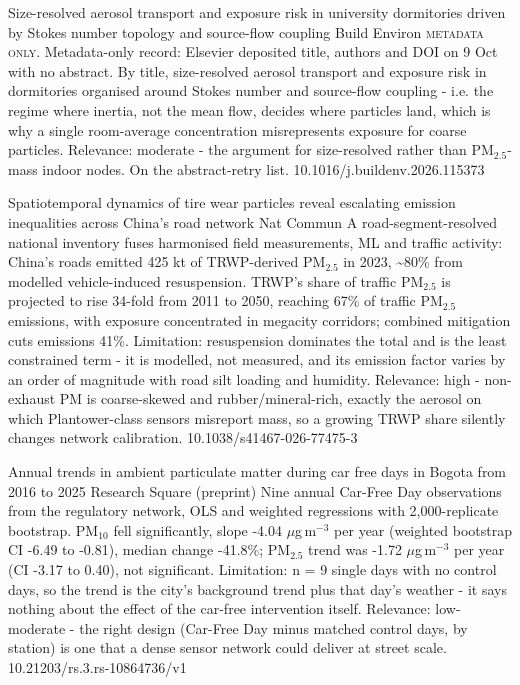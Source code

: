 \documentclass[10pt]{article}
\begin{document}
{Size-resolved aerosol transport and exposure risk in university dormitories driven by Stokes number topology and source-flow coupling}
{Build Environ}
{\textsc{metadata only.} Metadata-only record: Elsevier deposited title, authors and DOI on 9 Oct with no abstract. By title, size-resolved aerosol transport and exposure risk in dormitories organised around Stokes number and source-flow coupling - i.e. the regime where inertia, not the mean flow, decides where particles land, which is why a single room-average concentration misrepresents exposure for coarse particles. Relevance: moderate - the argument for size-resolved rather than PM$_{2.5}$-mass indoor nodes. On the abstract-retry list.}
{10.1016/j.buildenv.2026.115373}

\par{}\baselineskip{}\baselineskip
{}

{Spatiotemporal dynamics of tire wear particles reveal escalating emission inequalities across China's road network}
{Nat Commun}
{A road-segment-resolved national inventory fuses harmonised field measurements, ML and traffic activity: China's roads emitted 425 kt of TRWP-derived PM$_{2.5}$ in 2023, \textasciitilde{}80\% from modelled vehicle-induced resuspension. TRWP's share of traffic PM$_{2.5}$ is projected to rise 34-fold from 2011 to 2050, reaching 67\% of traffic PM$_{2.5}$ emissions, with exposure concentrated in megacity corridors; combined mitigation cuts emissions 41\%. Limitation: resuspension dominates the total and is the least constrained term - it is modelled, not measured, and its emission factor varies by an order of magnitude with road silt loading and humidity. Relevance: high - non-exhaust PM is coarse-skewed and rubber/mineral-rich, exactly the aerosol on which Plantower-class sensors misreport mass, so a growing TRWP share silently changes network calibration.}
{10.1038/s41467-026-77475-3}

{Annual trends in ambient particulate matter during car free days in Bogota from 2016 to 2025}
{Research Square (preprint)}
{Nine annual Car-Free Day observations from the regulatory network, OLS and weighted regressions with 2,000-replicate bootstrap. PM$_{10}$ fell significantly, slope -4.04 $\mu$g\,m$^{-3}$ per year (weighted bootstrap CI -6.49 to -0.81), median change -41.8\%; PM$_{2.5}$ trend was -1.72 $\mu$g\,m$^{-3}$ per year (CI -3.17 to 0.40), not significant. Limitation: n = 9 single days with no control days, so the trend is the city's background trend plus that day's weather - it says nothing about the effect of the car-free intervention itself. Relevance: low-moderate - the right design (Car-Free Day minus matched control days, by station) is one that a dense sensor network could deliver at street scale.}
{10.21203/rs.3.rs-10864736/v1}
\end{document}
